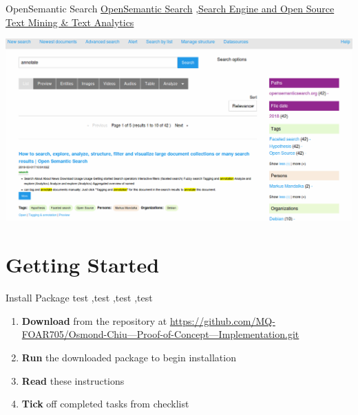 \documentclass[10pt,a4paper]{article}
\begin{document}
\begin{textbox}{OpenSemantic Search}
 \href{https://www.opensemanticsearch.org}{OpenSemantic Search} \sep \href{https://www.opensemanticsearch.org}{Search Engine and Open Source Text Mining & Text Analytics}

\includegraphics[width=\textwidth]{search.png}

\end{textbox}



\section{Getting Started}



\begin{textbox}{Install Package}
test  \sep test \sep test \sep test

\bigskip

\begin{enumerate}
\item \textbf{Download} from the repository at \href{https://github.com/MQ-FOAR705/Osmond-Chiu---Proof-of-Concept---Implementation.git}{https://github.com/MQ-FOAR705/Osmond-Chiu---Proof-of-Concept---Implementation.git}
\item \textbf{Run} the downloaded package to begin installation
\item \textbf{Read} these instructions
\item \textbf{Tick} off completed tasks from checklist
\end{enumerate}

\end{textbox}

\end{document}
